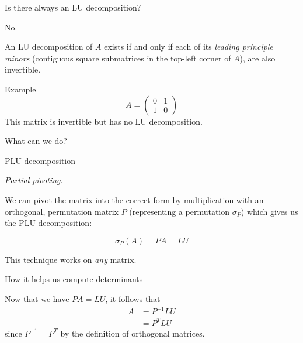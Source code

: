 \documentclass{beamer}
\begin{document}
\begin{frame}{Is there always an LU decomposition?}

    \alert{No.}

    An LU decomposition of $A$ exists if and only if each of its \emph{leading principle minors}
    (contiguous square submatrices in the top-left corner of $A$),
    are also invertible.

    \pause{}

    \begin{exampleblock}{Example}
        \[
           A= \begin{pmatrix}{}
                0 & 1 \\
                1 & 0
            \end{pmatrix}
        \]
        This matrix is invertible but has no LU decomposition.
    \end{exampleblock}

    \pause{}

    \begin{alertblock}{}
        What can we do?
    \end{alertblock}

\end{frame}

\begin{frame}{PLU decomposition}

    \emph{Partial pivoting}.

    We can pivot the matrix into the correct form by multiplication with
    an orthogonal, permutation matrix $P$ (representing a permutation $\sigma_P$)
    which gives us the PLU decomposition:

    \[
        \sigma_P(A) = PA = LU
    \]

    \pause{}

    \begin{block}{}
        This technique works on \emph{any} matrix.
    \end{block}

\end{frame}

\begin{frame}{How it helps us compute determinants}

    Now that we have $PA = LU$, it follows that
    \begin{align*}
        A &= P^{-1}LU \\
          &= P^T LU
    \end{align*}
    since $P^{-1} = P^T$ by the definition of orthogonal matrices.

\end{frame}
\end{document}
